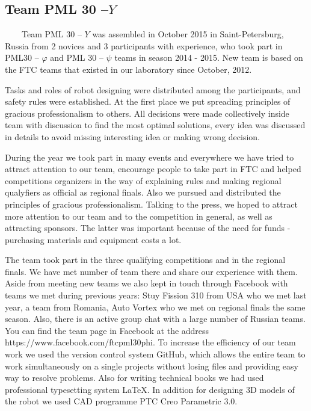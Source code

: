 
\subsection{Team PML 30 --${Y}$} 
	
	
        Team PML 30 -- ${Y}$ was assembled in October 2015 in Saint-Petersburg, Russia from 2 novices and 3 participants with experience, who took part in PML30 -- ${\varphi}$ and PML 30 -- ${\psi}$ teams in season 2014 - 2015. New team is based on the FTC teams that existed in our laboratory since October, 2012. 
	
	Tasks and roles of robot designing were distributed among the participants, and safety rules were established. At the first place we put spreading principles of gracious professionalism to others. All decisions were made collectively inside team with discussion to find the most optimal solutions, every idea was discussed in details to avoid missing interesting idea or making wrong decision. 
	
	During the year we took part in many events and everywhere we have tried to attract attention to our team, encourage people to take part in FTC and helped competitions organizers in the way of explaining rules and making regional qualyfiers as official as regional finals. Also we pursued and distributed the principles of gracious professionalism. Talking to the press, we hoped to attract more attention to our team and to the competition in general, as well as attracting sponsors. The latter was important because of the need for funds - purchasing materials and equipment costs a lot.
	
	The team took part in the three qualifying competitions and in the regional finals. We have met number of team there and share our experience with them. Aside from meeting new teams we also kept in touch through Facebook with teams we met during previous years: Stuy Fission 310 from USA who we met last year, a team from Romania, Auto Vortex who we met on regional finals the same season. Also, there is an active group chat with a large number of Russian teams. You can find the team page in Facebook at the address https://www.facebook.com/ftcpml30phi.
	To increase the efficiency of our team work we used the version control system GitHub, which allows the entire team to work simultaneously on a single projects without losing files and providing easy way to resolve problems. Also for writing technical books we had used professional typesetting system LaTeX.
	In addition for designing 3D models of the robot we used CAD programme PTC Creo Parametric 3.0.
	
